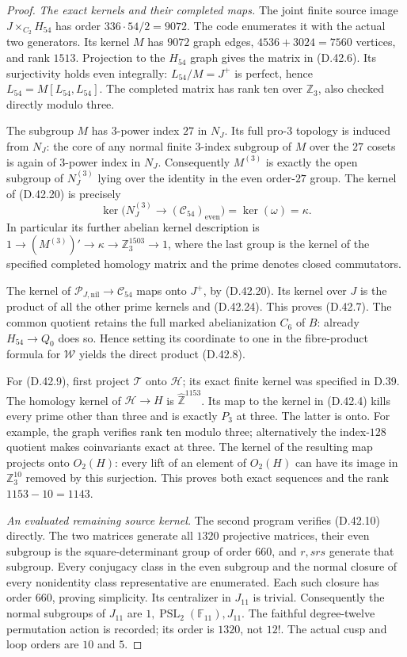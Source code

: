 \begin{proof}
\emph{The exact kernels and their completed maps.}
The joint finite source image
$J\times_{C_2}H_{54}$ has order
$336\cdot54/2=9072$. The code enumerates
it with the actual two generators.
Its kernel $M$ has $9072$ graph edges,
$4536+3024=7560$ vertices, and rank
$1513$. Projection to the $H_{54}$
graph gives the matrix in (D.42.6).
Its surjectivity holds even integrally:
$L_{54}/M=J^+$ is perfect, hence
$L_{54}=M[L_{54},L_{54}]$.
The completed matrix has rank ten
over $\mathbb Z_3$, also checked
directly modulo three.

The subgroup $M$ has $3$-power index
$27$ in $N_J$. Its full pro-$3$
topology is induced from $N_J$:
the core of any normal finite
$3$-index subgroup of $M$ over the
$27$ cosets is again of $3$-power
index in $N_J$. Consequently
$M^{(3)}$ is exactly the open
subgroup of $N_J^{(3)}$ lying over
the identity in the even order-$27$
group. The kernel of (D.42.20)
is precisely
\[
 \ker\bigl(N_J^{(3)}
                  \to(\mathcal C_{54})_{\mathrm{even}}\bigr)
      =\ker(\omega)=\kappa.                            \tag{D.42.24}
\]
In particular its further abelian
kernel description is
$1\to(M^{(3)})'\to\kappa\to
\mathbb Z_3^{1503}\to1$, where the
last group is the kernel of the
specified completed homology
matrix and the prime denotes
closed commutators.

The kernel of
$\mathcal P_{J,\mathrm{nil}}\to
\mathcal C_{54}$ maps onto $J^+$,
by (D.42.20). Its kernel over $J$
is the product of all the other
prime kernels and (D.42.24).
This proves (D.42.7). The common
quotient retains the full marked
abelianization $C_6$ of $B$:
already $H_{54}\to Q_0$ does so.
Hence setting its coordinate to
one in the fibre-product formula
for $\mathcal W$ yields the direct
product (D.42.8).

For (D.42.9), first project
$\mathcal T$ onto $\mathcal H$;
its exact finite kernel was
specified in D.39. The homology
kernel of $\mathcal H\to H$
is $\widehat{\mathbb Z}^{1153}$.
Its map to the kernel in
(D.42.4) kills every prime other
than three and is exactly $P_3$
at three. The latter is onto.
For example, the graph verifies
rank ten modulo three; alternatively
the index-$128$ quotient makes
coinvariants exact at three.
The kernel of the resulting map
projects onto $O_2(H)$: every
lift of an element of $O_2(H)$
can have its image in
$\mathbb Z_3^{10}$ removed by
this surjection. This proves
both exact sequences and the
rank $1153-10=1143$.

\emph{An evaluated remaining source kernel.}
The second program verifies
(D.42.10) directly. The two
matrices generate all $1320$
projective matrices, their even
subgroup is the square-determinant
group of order $660$, and
$r,srs$ generate that subgroup.
Every conjugacy class in the
even subgroup and the normal
closure of every nonidentity
class representative are
enumerated. Each such closure
has order $660$, proving
simplicity. Its centralizer
in $J_{11}$ is trivial.
Consequently the normal
subgroups of $J_{11}$ are
$1,\operatorname{PSL}_2(\mathbb F_{11}),J_{11}$.
The faithful degree-twelve
permutation action is recorded;
its order is $1320$, not $12!$.
The actual cusp and loop
orders are $10$ and $5$.


\end{proof}
